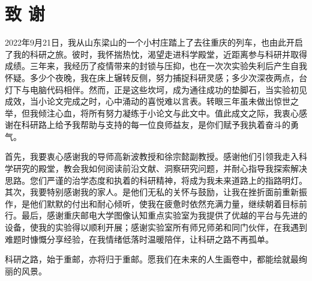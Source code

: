 \chapter{致 \quad 谢}
\thispagestyle{others}
\pagestyle{others}
\xiaosi
2022年9月21日，我从山东梁山的一个小村庄踏上了去往重庆的列车，也由此开启了我的科研之旅。彼时，我怀揣热忱，渴望走进科学殿堂，近距离参与科研并取得成绩。三年来，我经历了疫情带来的封锁与压抑，也在一次次实验失利后产生自我怀疑。多少个夜晚，我在床上辗转反侧，努力捕捉科研灵感；多少次深夜两点，台灯下与电脑代码相伴。然而，正是这些坎坷，成为通往成功的垫脚石，当实验初见成效，当小论文完成之时，心中涌动的喜悦难以言表。转眼三年虽未做出惊世之举，但我倾注心血，将所有努力凝练于小论文与此文中。值此成文之际，我衷心感谢在科研路上给予我帮助与支持的每一位良师益友，是你们赋予我执着奋斗的勇气。

首先，我要衷心感谢我的导师高新波教授和徐宗懿副教授。感谢他们引领我走入科学研究的殿堂，教会我如何阅读前沿文献、洞察研究问题，并耐心指导我探索解决思路。您们严谨的治学态度和执着的科研精神，将成为我未来道路上的指路明灯。其次，我要特别感谢我的家人。是他们无私的关怀与鼓励，让我在挫折面前重新振作，是他们默默的付出和耐心倾听，使我在疲惫时依然充满力量，继续朝着目标前行。最后，感谢重庆邮电大学图像认知重点实验室为我提供了优越的平台与先进的设备，使我的实验得以顺利开展；感谢实验室所有师兄师弟和同门伙伴，在我遇到难题时慷慨分享经验，在我情绪低落时温暖陪伴，让科研之路不再孤单。

科研之路，始于重邮，亦将归于重邮。愿我们在未来的人生画卷中，都能绘就最绚丽的风景。
